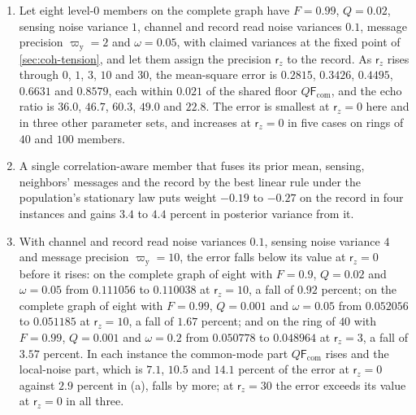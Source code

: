 \begin{observation}\label{obs:hie-top-down}
\leavevmode
\begin{enumerate}
\item[(a)] Let eight level-0 members on the complete graph have $F=0.99$, $Q=0.02$, sensing noise variance $1$, channel and record read noise variances $0.1$, message precision $\varpi_{\mathrm y}=2$ and $\omega=0.05$, with claimed variances at the fixed point of \cref{sec:coh-tension}, and let them assign the precision $\mathsf r_z$ to the record. As $\mathsf r_z$ rises through $0$, $1$, $3$, $10$ and $30$, the mean-square error is $0.2815$, $0.3426$, $0.4495$, $0.6631$ and $0.8579$, each within $0.021$ of the shared floor $Q\mathsf F_{\mathrm{com}}$, and the echo ratio is $36.0$, $46.7$, $60.3$, $49.0$ and $22.8$. The error is smallest at $\mathsf r_z=0$ here and in three other parameter sets, and increases at $\mathsf r_z=0$ in five cases on rings of $40$ and $100$ members.
\item[(b)] A single correlation-aware member that fuses its prior mean, sensing, neighbors' messages and the record by the best linear rule under the population's stationary law puts weight $-0.19$ to $-0.27$ on the record in four instances and gains $3.4$ to $4.4$ percent in posterior variance from it.
\item[(c)] With channel and record read noise variances $0.1$, sensing noise variance $4$ and message precision $\varpi_{\mathrm y}=10$, the error falls below its value at $\mathsf r_z=0$ before it rises: on the complete graph of eight with $F=0.9$, $Q=0.02$ and $\omega=0.05$ from $0.111056$ to $0.110038$ at $\mathsf r_z=10$, a fall of $0.92$ percent; on the complete graph of eight with $F=0.99$, $Q=0.001$ and $\omega=0.05$ from $0.052056$ to $0.051185$ at $\mathsf r_z=10$, a fall of $1.67$ percent; and on the ring of $40$ with $F=0.99$, $Q=0.001$ and $\omega=0.2$ from $0.050778$ to $0.048964$ at $\mathsf r_z=3$, a fall of $3.57$ percent. In each instance the common-mode part $Q\mathsf F_{\mathrm{com}}$ rises and the local-noise part, which is $7.1$, $10.5$ and $14.1$ percent of the error at $\mathsf r_z=0$ against $2.9$ percent in (a), falls by more; at $\mathsf r_z=30$ the error exceeds its value at $\mathsf r_z=0$ in all three.
\end{enumerate}
\end{observation}

